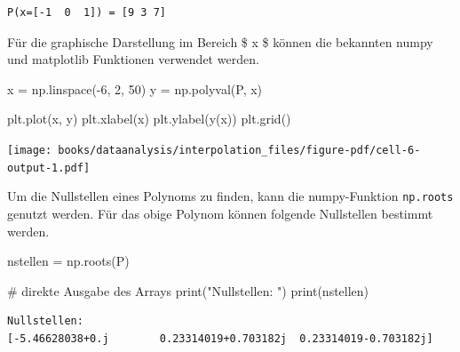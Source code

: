 \documentclass[
  letterpaper,
  DIV=11,
  numbers=noendperiod]{scrreprt}
\newenvironment{Shaded}{\begin{snugshade}}{\end{snugshade}}
\newcommand{\BuiltInTok}[1]{\textcolor[rgb]{0.00,0.23,0.31}{#1}}
\newcommand{\CommentTok}[1]{\textcolor[rgb]{0.37,0.37,0.37}{#1}}
\newcommand{\DecValTok}[1]{\textcolor[rgb]{0.68,0.00,0.00}{#1}}
\newcommand{\NormalTok}[1]{\textcolor[rgb]{0.00,0.23,0.31}{#1}}
\newcommand{\OperatorTok}[1]{\textcolor[rgb]{0.37,0.37,0.37}{#1}}
\newcommand{\StringTok}[1]{\textcolor[rgb]{0.13,0.47,0.30}{#1}}
\begin{document}
\begin{verbatim}
P(x=[-1  0  1]) = [9 3 7]
\end{verbatim}

Für die graphische Darstellung im Bereich \$ x \in [-6, 2]\$ können die
bekannten numpy und matplotlib Funktionen verwendet werden.

\begin{Shaded}
\begin{Highlighting}[]
\NormalTok{x }\OperatorTok{=}\NormalTok{ np.linspace(}\OperatorTok{{-}}\DecValTok{6}\NormalTok{, }\DecValTok{2}\NormalTok{, }\DecValTok{50}\NormalTok{)}
\NormalTok{y }\OperatorTok{=}\NormalTok{ np.polyval(P, x)}

\NormalTok{plt.plot(x, y)}
\NormalTok{plt.xlabel(}\StringTok{\textquotesingle{}x\textquotesingle{}}\NormalTok{)}
\NormalTok{plt.ylabel(}\StringTok{\textquotesingle{}y(x)\textquotesingle{}}\NormalTok{)}
\NormalTok{plt.grid()}
\end{Highlighting}
\end{Shaded}

\texttt{[image: books/dataanalysis/interpolation\_files/figure-pdf/cell-6-output-1.pdf]}

Um die Nullstellen eines Polynoms zu finden, kann die numpy-Funktion
\texttt{np.roots} genutzt werden. Für das obige Polynom können folgende
Nullstellen bestimmt werden.

\begin{Shaded}
\begin{Highlighting}[]
\NormalTok{nstellen }\OperatorTok{=}\NormalTok{ np.roots(P)}

\CommentTok{\# direkte Ausgabe des Arrays}
\BuiltInTok{print}\NormalTok{(}\StringTok{"Nullstellen: "}\NormalTok{)}
\BuiltInTok{print}\NormalTok{(nstellen)}
\end{Highlighting}
\end{Shaded}

\begin{verbatim}
Nullstellen: 
[-5.46628038+0.j        0.23314019+0.703182j  0.23314019-0.703182j]
\end{verbatim}
\end{document}
